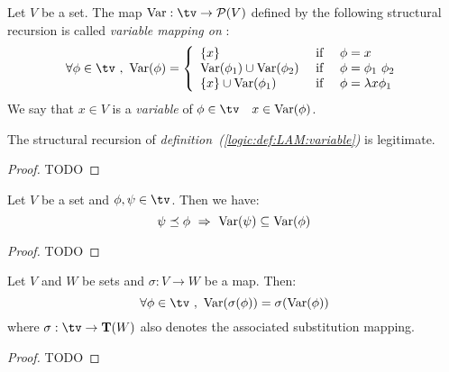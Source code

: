 \begin{defin}\label{logic:def:LAM:variable}
Let $V$ be a set. The map $\var:\tv\to {\cal P}(V)$ defined by the
following structural recursion is called {\em variable mapping on \tv}:
\begin{equation}\label{logic:eqn:LAM:var:recursion}
    \forall\phi\in\tv\ ,\ \var(\phi)
    =
    \left\{\begin{array}{lcl}
        \{x\}&\mbox{\ if\ }&\phi=x
        \\
        \var(\phi_{1})\cup\var(\phi_{2}) &\mbox{\ if\ }&\phi=\phi_{1}\ \phi_{2}
        \\
        \{x\}\cup\var(\phi_{1})&\mbox{\ if\ }&\phi=\lambda x\phi_{1}
    \end{array}\right.
\end{equation}
We say that $x\in V$ is a {\em variable} of $\phi\in\tv$ \ifand\ $x\in\mbox{\rm Var}(\phi)$.
\end{defin}

\begin{prop}\label{logic:prop:LAM:variable}
    The structural recursion of {\em definition~(\ref{logic:def:LAM:variable})} 
    is legitimate.
\end{prop}
\begin{proof}
TODO
\end{proof}

\begin{prop}\label{logic:prop:LAM:variable:subformula}
Let $V$ be a set and $\phi,\psi\in\tv$. Then we have:
    \[
    \psi\preceq\phi\ \Rightarrow\ \var(\psi)\subseteq\var(\phi)
    \]
\end{prop}
\begin{proof}
TODO
\end{proof}

\begin{prop}\label{logic:prop:LAM:var:of:substitution}
Let $V$ and $W$ be sets and $\sigma:V\to W$ be a map. Then:
    \[
    \forall\phi\in\tv\ ,\ \var(\sigma(\phi))=\sigma(\var(\phi))
    \]
where $\sigma:\tv\to{\bf T}(W)$ also denotes the associated substitution mapping.
\end{prop}
\begin{proof}
TODO
\end{proof}

